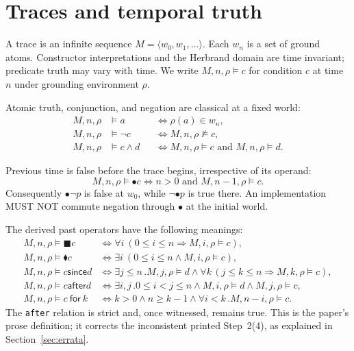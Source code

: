 \documentclass[11pt]{article}
\newcommand{\prev}{\mathbin{\bullet}}
\newcommand{\alwayspast}{\mathbin{\blacksquare}}
\newcommand{\once}{\mathbin{\blacklozenge}}
\newcommand{\since}{\mathbin{\mathsf{since}}}
\newcommand{\after}{\mathbin{\mathsf{after}}}
\begin{document}
\section{Traces and temporal truth}\label{sec:trace-semantics}

A trace is an infinite sequence $M=\langle w_0,w_1,\ldots\rangle$.  Each
$w_n$ is a set of ground atoms.  Constructor interpretations and the Herbrand
domain are time invariant; predicate truth may vary with time.  We write
$M,n,\rho\models c$ for condition $c$ at time $n$ under grounding
environment $\rho$.

Atomic truth, conjunction, and negation are classical at a fixed world:
\begin{align*}
M,n,\rho &\models a &&\Longleftrightarrow \rho(a)\in w_n,\\
M,n,\rho &\models \neg c &&\Longleftrightarrow M,n,\rho\not\models c,\\
M,n,\rho &\models c\wedge d &&\Longleftrightarrow
  M,n,\rho\models c\text{ and }M,n,\rho\models d.
\end{align*}

Previous time is false before the trace begins, irrespective of its operand:
\[
M,n,\rho\models \prev c
\Longleftrightarrow n>0\text{ and }M,n-1,\rho\models c.
\]
Consequently $\prev\neg p$ is false at $w_0$, while
$\neg\prev p$ is true there.  An implementation MUST NOT commute negation
through $\prev$ at the initial world.

The derived past operators have the following meanings:
\begin{align*}
M,n,\rho\models \alwayspast c
&\Longleftrightarrow \forall i\ (0\le i\le n\Rightarrow M,i,\rho\models c),\\
M,n,\rho\models \once c
&\Longleftrightarrow \exists i\ (0\le i\le n\land M,i,\rho\models c),\\
M,n,\rho\models c\since d
&\Longleftrightarrow \exists j\le n\,.
  M,j,\rho\models d\land
  \forall k\,(j\le k\le n\Rightarrow M,k,\rho\models c),\\
M,n,\rho\models c\after d
&\Longleftrightarrow \exists i,j\,.
  0\le i<j\le n\land M,i,\rho\models d\land M,j,\rho\models c,\\
M,n,\rho\models c\ \mathsf{for}\ k
&\Longleftrightarrow k>0\land n\ge k-1\land
  \forall i<k\,. M,n-i,\rho\models c.
\end{align*}
The \verb|after| relation is strict and, once witnessed, remains true.  This
is the paper's prose definition; it corrects the inconsistent printed
Step~2(4), as explained in Section~\ref{sec:errata}.
\end{document}

